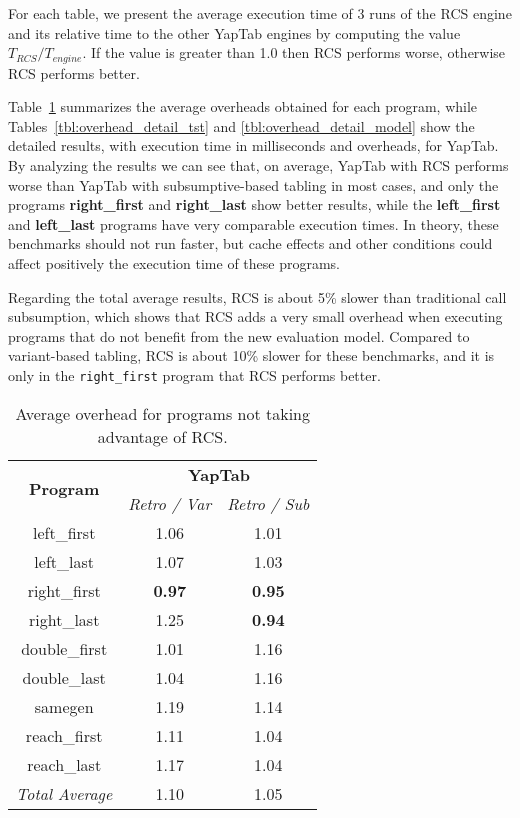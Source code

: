 For each table, we present the average execution time of 3 runs of the RCS engine and its relative time
to the other YapTab engines by computing the value $T_{RCS} / T_{engine}$.
If the value is greater than 1.0 then RCS performs worse, otherwise RCS performs better.

Table~\ref{tbl:overhead_overview} summarizes the average overheads obtained for each program,
while Tables~\ref{tbl:overhead_detail_tst} and \ref{tbl:overhead_detail_model} show the detailed
results, with execution time in milliseconds and overheads, for YapTab.
By analyzing the results we can see that, on average, YapTab with RCS performs worse
than YapTab with subsumptive-based tabling in most cases, and only the
programs \textbf{right\_first} and \textbf{right\_last} show better results,
while the \textbf{left\_first} and \textbf{left\_last} programs have very comparable execution times.
In theory, these benchmarks should not run faster, but cache effects and other
conditions could affect positively the execution time of these programs.

Regarding the total average results, RCS is about 5\% slower than traditional call subsumption,
which shows that RCS adds a very small overhead when executing programs that do not benefit from the
new evaluation model. Compared to variant-based tabling, RCS is about 10\% slower for these benchmarks,
and it is only in the \texttt{right\_first} program that RCS performs better.

\begin{table}[ht]
\centering
  \begin{tabular}{ccc}
   \hline
    \hline
    \multirow{2}{*}{\textbf{Program}} & \multicolumn{2}{c}{\textbf{YapTab}} \\
    & \textit{\small{Retro / Var}} & \textit{\small{Retro / Sub}} \\
   \hline
   \hline
   left\_first & 1.06 & 1.01 \\
   left\_last &  1.07  & 1.03 \\
   right\_first & \textbf{0.97} & \textbf{0.95} \\
   right\_last & 1.25 & \textbf{0.94} \\
   double\_first & 1.01 & 1.16 \\
   double\_last & 1.04 & 1.16 \\
   samegen & 1.19 & 1.14 \\
   reach\_first  &  1.11  & 1.04 \\
   reach\_last  &  1.17  & 1.04 \\
\hline
\hline
\textit{Total Average} &  1.10 &  1.05 \\
\hline
\hline
\end{tabular}
\caption{Average overhead for programs not taking advantage of RCS.}
\label{tbl:overhead_overview}
\end{table}

